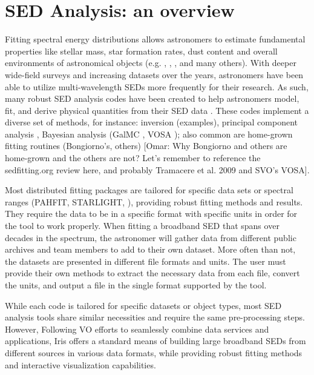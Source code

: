 \section{SED Analysis: an overview}
\label{sec:overview}

Fitting spectral energy distributions allows astronomers to estimate fundamental properties like stellar mass, star formation rates, dust content and overall environments of astronomical objects (e.g. \citet{1998AJ....115.1329S}, \citet{2001ApJS..137..139S}, \citet{2007ApJS..169..328R}, and many others). With deeper wide-field surveys and increasing datasets over the years, astronomers have been able to utilize multi-wavelength SEDs more frequently for their research. As such, many robust SED analysis codes have been created to help astronomers model, fit, and derive physical quantities from their SED data \citep{2011Ap&SS.331....1W,2013ARA&A..51..393C}. These codes implement a diverse set of methods, for instance: inversion (examples), principal component analysis \cite{2009MNRAS.394.1496B}, Bayesian analysis (GalMC \citep{2011ApJ...737...47A}, VOSA \citep{2008A&A...492..277B}); also common are home-grown fitting routines (Bongiorno's, others) [Omar: Why Bongiorno and others are home-grown and the others are not? Let's remember to reference the sedfitting.org review here, and probably Tramacere et al. 2009 and SVO's VOSA]. 

Most distributed fitting packages are tailored for specific data sets or spectral ranges (PAHFIT, STARLIGHT, ), providing robust fitting methods and results. They require the data to be in a specific format with specific units in order for the tool to work properly. When fitting a broadband SED that spans over decades in the spectrum, the astronomer will gather data from different public archives and team members to add to their own dataset. More often than not, the datasets are presented in different file formats and units. The user must provide their own methods to extract the necessary data from each file, convert the units, and output a file in the single format supported by the tool. 

While each code is tailored for specific datasets or object types, most SED analysis tools share similar necessities and require the same pre-processing steps. However,  Following VO efforts to seamlessly combine data services and applications, Iris offers a standard means of building large broadband SEDs from different sources in various data formats, while providing robust fitting methods and interactive visualization capabilities.

